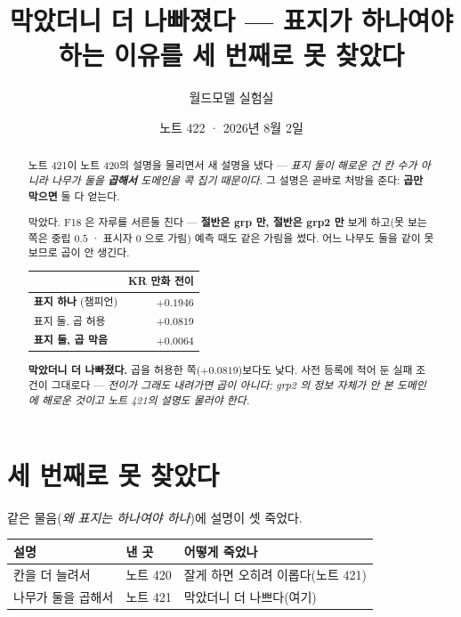 \documentclass[11pt]{article}
\begin{document}
\title{막았더니 더 나빠졌다 --- 표지가 하나여야 하는 이유를 세 번째로 못 찾았다}
\author{월드모델 실험실}
\date{노트 422 · 2026년 8월 2일}
\maketitle

\begin{abstract}
노트 421이 노트 420의 설명을 물리면서 새 설명을 냈다 --- \emph{표지 둘이
해로운 건 칸 수가 아니라 나무가 둘을 \textbf{곱해서} 도메인을 콕 집기
때문이다.} 그 설명은 곧바로 처방을 준다: \textbf{곱만 막으면} 둘 다 얻는다.

막았다. F18 은 자루를 서른둘 친다 --- \textbf{절반은 grp 만, 절반은 grp2 만}
보게 하고(못 보는 쪽은 중립 $0.5$ · 표시자 $0$ 으로 가림) 예측 때도 같은
가림을 썼다. 어느 나무도 둘을 같이 못 보므로 곱이 안 생긴다.

\begin{center}
\begin{tabular}{lr}
\hline
 & KR 만화 전이 \\
\hline
\textbf{표지 하나} (챔피언) & $\mathbf{+0.1946}$ \\
표지 둘, 곱 허용 & $+0.0819$ \\
\textbf{표지 둘, 곱 막음} & $\mathbf{+0.0064}$ \\
\hline
\end{tabular}
\end{center}

\textbf{막았더니 더 나빠졌다.} 곱을 허용한 쪽($+0.0819$)보다도 낮다.
사전 등록에 적어 둔 실패 조건이 그대로다 --- \emph{전이가 그래도 내려가면
곱이 아니다; grp2 의 정보 자체가 안 본 도메인에 해로운 것이고 노트 421의
설명도 물러야 한다.}
\end{abstract}

\section{세 번째로 못 찾았다}

같은 물음(\emph{왜 표지는 하나여야 하나})에 설명이 셋 죽었다.

\begin{center}
\begin{tabular}{lll}
\hline
설명 & 낸 곳 & 어떻게 죽었나 \\
\hline
칸을 더 늘려서 & 노트 420 & 잘게 하면 오히려 이롭다(노트 421) \\
나무가 둘을 곱해서 & 노트 421 & 막았더니 더 나쁘다(여기) \\
\hline
\end{tabular}
\end{center}
\end{document}
